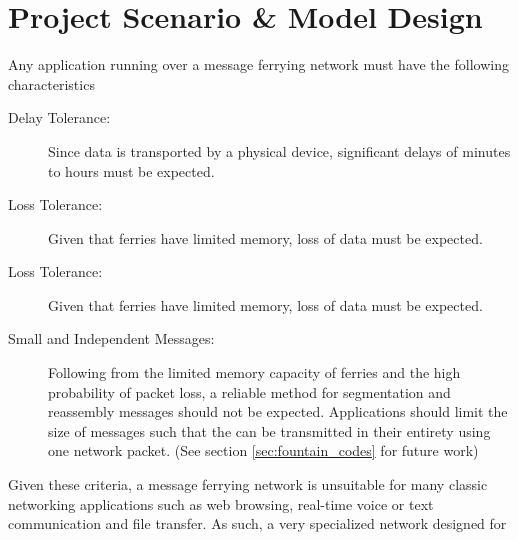 \chapter{Project Scenario \& Model Design} 

Any application running over a message ferrying network must have the following characteristics
\begin{description}
\item[Delay Tolerance: ]
Since data is transported by a physical device, significant delays of minutes to hours must be expected.
\item[Loss Tolerance: ]
Given that ferries have limited memory, loss of data must be expected.
\item[Loss Tolerance: ]
Given that ferries have limited memory, loss of data must be expected.
\item[Small and Independent Messages: ]
Following from the limited memory capacity of ferries and the high probability of packet loss, a reliable method for segmentation and reassembly messages should not be expected. 
Applications should limit the size of messages such that the can be transmitted in their entirety using one network packet.
(See section \ref{sec:fountain_codes} for future work)
\end{description}

Given these criteria, a message ferrying network is unsuitable for many classic networking applications such as web browsing, real-time voice or text communication and file transfer.
As such, a very specialized network designed for 